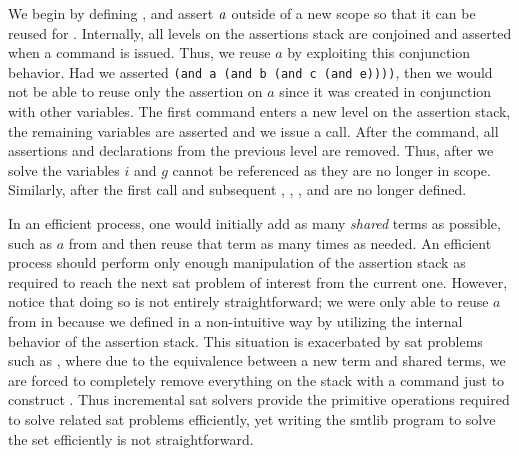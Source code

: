 We begin by defining \pV{}, and assert $\mathit{a}$ outside of a new scope so that
it can be reused for \qV{}. Internally, all levels on the assertions stack are
conjoined and asserted when a  command is issued. Thus, we reuse
$a$ by exploiting this conjunction behavior. Had we asserted
\lstinline{(and a (and b (and c (and e))))}, then we would not be able to reuse
only the assertion on $a$ since it was created in conjunction with other
variables. The first  command enters a new level on the assertion
stack, the remaining variables are asserted and we issue a  call.
After the  command, all assertions and declarations from the previous
level are removed. Thus, after we solve \qV{} the variables $i$ and $g$ cannot
be referenced as they are no longer in scope. Similarly, after the first
 call and subsequent , \eV{}, \cV{}, and \bV{} are no
longer defined.

In an efficient process, one would initially add as many \emph{shared} terms as
possible, such as $a$ from \pV{} and then reuse that term as many times as
needed. An efficient process should perform only enough manipulation of the
assertion stack as required to reach the next \ac{sat} problem of interest from
the current one. However, notice that doing so is not entirely straightforward;
we were only able to reuse $a$ from \pV{} in \qV{} because we defined \pV{} in a
non-intuitive way by utilizing the internal behavior of the assertion stack.
This situation is exacerbated by \ac{sat} problems such as \rV{}, where due to
the equivalence between a new term and shared terms, we are forced to completely
remove everything on the stack with a  command just to construct
\rV{}. Thus incremental \ac{sat} solvers provide the primitive operations
required to solve related \ac{sat} problems efficiently, yet writing the
\acl{smtlib} program to solve the set efficiently is not straightforward.

